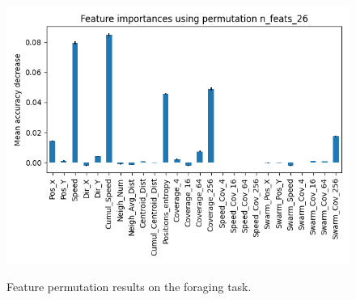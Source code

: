 \documentclass[../../Thesis.tex]{subfiles}
\begin{document}
\begin{figure}
{							\includegraphics[scale=0.31]{../../Images/Experiments/foraging_images/Feature_importances_using_permutation_n_feats_26.png}
					}
					\caption{Feature permutation results on the foraging task.}
					\label{fig:foraging_feature_permutation}
				\end{figure}
				
\end{document}
